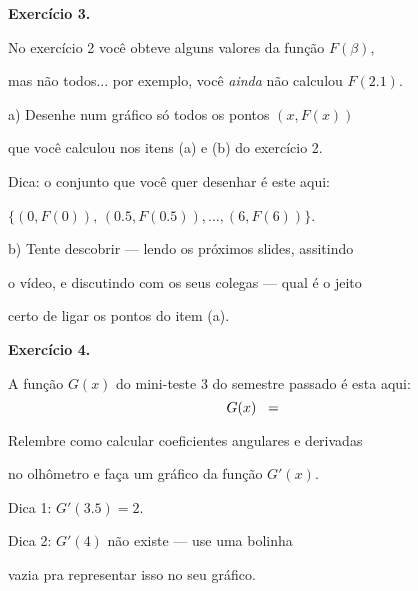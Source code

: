 \documentclass[oneside,12pt]{article}
\begin{document}
\newpage


{\bf Exercício 3.}

No exercício 2 você obteve alguns valores da função $F(β)$,

mas não todos... por exemplo, você {\sl ainda} não calculou $F(2.1)$.

\msk

a) Desenhe num gráfico só todos os pontos $(x,F(x))$

que você calculou nos itens (a) e (b) do exercício 2.

Dica: o conjunto que você quer desenhar é este aqui:

$\{(0,F(0)), \, (0.5,F(0.5)), \ldots, (6,F(6))\}$.

\msk

b) Tente descobrir --- lendo os próximos slides, assitindo

o vídeo, e discutindo com os seus colegas --- qual é o jeito

certo de ligar os pontos do item (a).


\newpage


{\bf Exercício 4.}

A função $G(x)$ do mini-teste 3 do semestre passado é esta aqui:
%
\pu
%
$$G(x) \;\;=\;\;\,
    \unitlength=15pt
    \scalebox{0.7}{$\ga{Ex 4}$}
$$

Relembre como calcular coeficientes angulares e derivadas

no olhômetro e faça um gráfico da função $G'(x)$.

\ssk

Dica 1: $G'(3.5)=2$.

Dica 2: $G'(4)$ não existe --- use uma bolinha

vazia pra representar isso no seu gráfico.
\end{document}

